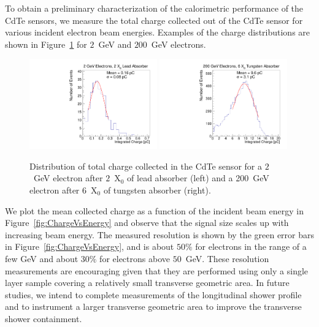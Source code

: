 \documentclass[preprint,1p]{elsarticle}
\begin{document}
To obtain a preliminary characterization of the calorimetric performance 
of the CdTe sensors, we measure the total charge collected out of the CdTe 
sensor for various incident electron beam energies. Examples of the 
charge distributions are shown in Figure~\ref{fig:ChargeDistribution}
for $2$~GeV and $200$~GeV electrons.

\begin{figure}[htbp] 
\centering
\includegraphics[width=0.49\textwidth]{figures/2GeV_charge.pdf} 
\includegraphics[width=0.49\textwidth]{figures/200GeV_charge.pdf} 
\caption{Distribution of total charge collected in the CdTe sensor for a $2$~GeV
electron after $2$~$\mathrm{X}_{0}$ of lead absorber (left) and a 200~GeV
electron after $6$~$\mathrm{X}_{0}$ of tungsten absorber (right). } 
\label{fig:ChargeDistribution} 
\end{figure} 

We plot the mean collected charge as a function of the incident beam energy
in Figure~\ref{fig:ChargeVsEnergy} and observe that the signal size scales
up with increasing beam energy. The measured resolution is shown by the green
error bars in Figure~\ref{fig:ChargeVsEnergy}, and is about $50\%$ for electrons
in the range of a few GeV and about $30\%$ for electrons above $50$~GeV. 
These resolution measurements are encouraging given that they are performed
using only a single layer sample covering a relatively small transverse
geometric area. In future studies, we intend to complete measurements of the
longitudinal shower profile and to instrument a larger transverse geometric
area to improve the transverse shower containment. 
\end{document}
